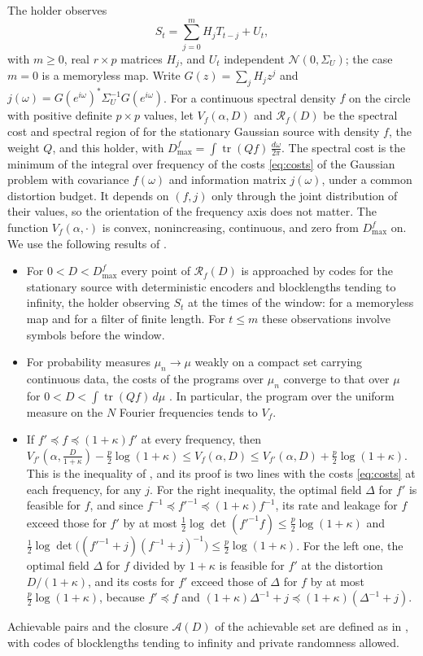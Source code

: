 \documentclass[11pt,onecolumn]{IEEEtran}
\newcommand{\tr}{\operatorname{tr}}
\newcommand{\dw}{\tfrac{d\omega}{2\pi}}
\begin{document}
The holder observes
\[
S_t=\sum_{j=0}^mH_jT_{t-j}+U_t,
\]
with $m\ge0$, real $r\times p$ matrices $H_j$, and $U_t$ independent
$\mathcal N(0,\Sigma_U)$; the case $m=0$ is a memoryless map. Write
$G(z)=\sum_jH_jz^j$ and $j(\omega)=G(e^{i\omega})^*\Sigma_U^{-1}G(e^{i\omega})$.
For a continuous spectral density $f$ on the circle with positive
definite $p\times p$ values, let $V_f(\alpha,D)$ and $\mathcal R_f(D)$ be
the spectral cost and spectral region of \cite{part2} for the
stationary Gaussian source with density $f$, the weight $Q$, and this
holder, with $D_{\max}^f=\int\tr(Qf)\,\dw$. The spectral cost is the
minimum of the integral over frequency of the costs \eqref{eq:costs} of
the Gaussian problem with covariance $f(\omega)$ and information
matrix $j(\omega)$, under a common distortion budget. It depends on
$(f,j)$ only through the joint distribution of their values, so the
orientation of the frequency axis does not matter. The function
$V_f(\alpha,\cdot)$ is convex, nonincreasing, continuous, and zero from
$D_{\max}^f$ on. We use the following results of \cite{part2}.
\begin{itemize}
\item[(i)] For $0<D<D_{\max}^f$ every point of $\mathcal R_f(D)$ is
approached by codes for the stationary source with deterministic
encoders and blocklengths tending to infinity, the holder observing
$S_t$ at the times of the window: \cite[Theorem~16]{part2} for a
memoryless map and \cite[Theorem~20]{part2} for a filter of finite
length. For $t\le m$ these observations involve symbols before the
window.
\item[(ii)] For probability measures $\mu_n\to\mu$ weakly on a compact
set carrying continuous data, the costs of the programs over $\mu_n$
converge to that over $\mu$ for $0<D<\int\tr(Qf)\,d\mu$
\cite[Lemma~2]{part2}. In particular, the program over the uniform
measure on the $N$ Fourier frequencies tends to $V_f$.
\item[(iii)] If $f'\preceq f\preceq(1+\kappa)f'$ at every frequency,
then
$V_{f'}(\alpha,\tfrac D{1+\kappa})-\tfrac p2\log(1+\kappa)\le V_f(\alpha,D)\le V_{f'}(\alpha,D)+\tfrac p2\log(1+\kappa)$.
This is the inequality of \cite[Lemma~11(c)]{part2}, and its proof is
two lines with the costs \eqref{eq:costs} at each frequency, for any
$j$. For the right inequality, the optimal field $\Delta$ for $f'$ is
feasible for $f$, and since $f^{-1}\preceq f'^{-1}\preceq(1+\kappa)f^{-1}$,
its rate and leakage for $f$ exceed those for $f'$ by at most
$\tfrac12\log\det(f'^{-1}f)\le\tfrac p2\log(1+\kappa)$ and
$\tfrac12\log\det\bigl((f'^{-1}+j)(f^{-1}+j)^{-1}\bigr)\le\tfrac p2\log(1+\kappa)$.
For the left one, the optimal field $\Delta$ for $f$ divided by
$1+\kappa$ is feasible for $f'$ at the distortion $D/(1+\kappa)$, and
its costs for $f'$ exceed those of $\Delta$ for $f$ by at most
$\tfrac p2\log(1+\kappa)$, because $f'\preceq f$ and
$(1+\kappa)\Delta^{-1}+j\preceq(1+\kappa)(\Delta^{-1}+j)$.
\end{itemize}
Achievable pairs and the closure $\mathcal A(D)$ of the achievable set
are defined as in \cite[Sec.~VI]{part3}, with codes of blocklengths
tending to infinity and private randomness allowed.
\end{document}
